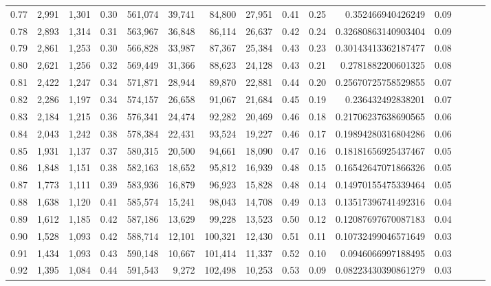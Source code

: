 \begin{tabular}{rrrrrrrrrrrrrrr}
0.77 &   2,991 &  1,301 &  0.30 &  561,074 &   39,741 &   84,800 &   27,951 &  0.41 &  0.25 &     0.352466940426249 &      0.09 \\
0.78 &   2,893 &  1,314 &  0.31 &  563,967 &   36,848 &   86,114 &   26,637 &  0.42 &  0.24 &   0.32680863140903404 &      0.09 \\
0.79 &   2,861 &  1,253 &  0.30 &  566,828 &   33,987 &   87,367 &   25,384 &  0.43 &  0.23 &   0.30143413362187477 &      0.08 \\
0.80 &   2,621 &  1,256 &  0.32 &  569,449 &   31,366 &   88,623 &   24,128 &  0.43 &  0.21 &    0.2781882200601325 &      0.08 \\
0.81 &   2,422 &  1,247 &  0.34 &  571,871 &   28,944 &   89,870 &   22,881 &  0.44 &  0.20 &   0.25670725758529855 &      0.07 \\
0.82 &   2,286 &  1,197 &  0.34 &  574,157 &   26,658 &   91,067 &   21,684 &  0.45 &  0.19 &     0.236432492838201 &      0.07 \\
0.83 &   2,184 &  1,215 &  0.36 &  576,341 &   24,474 &   92,282 &   20,469 &  0.46 &  0.18 &   0.21706237638690565 &      0.06 \\
0.84 &   2,043 &  1,242 &  0.38 &  578,384 &   22,431 &   93,524 &   19,227 &  0.46 &  0.17 &   0.19894280316804286 &      0.06 \\
0.85 &   1,931 &  1,137 &  0.37 &  580,315 &   20,500 &   94,661 &   18,090 &  0.47 &  0.16 &   0.18181656925437467 &      0.05 \\
0.86 &   1,848 &  1,151 &  0.38 &  582,163 &   18,652 &   95,812 &   16,939 &  0.48 &  0.15 &   0.16542647071866326 &      0.05 \\
0.87 &   1,773 &  1,111 &  0.39 &  583,936 &   16,879 &   96,923 &   15,828 &  0.48 &  0.14 &   0.14970155475339464 &      0.05 \\
0.88 &   1,638 &  1,120 &  0.41 &  585,574 &   15,241 &   98,043 &   14,708 &  0.49 &  0.13 &   0.13517396741492316 &      0.04 \\
0.89 &   1,612 &  1,185 &  0.42 &  587,186 &   13,629 &   99,228 &   13,523 &  0.50 &  0.12 &   0.12087697670087183 &      0.04 \\
0.90 &   1,528 &  1,093 &  0.42 &  588,714 &   12,101 &  100,321 &   12,430 &  0.51 &  0.11 &   0.10732499046571649 &      0.03 \\
0.91 &   1,434 &  1,093 &  0.43 &  590,148 &   10,667 &  101,414 &   11,337 &  0.52 &  0.10 &    0.0946066997188495 &      0.03 \\
0.92 &   1,395 &  1,084 &  0.44 &  591,543 &    9,272 &  102,498 &   10,253 &  0.53 &  0.09 &   0.08223430390861279 &      0.03 \\

\end{tabular}
